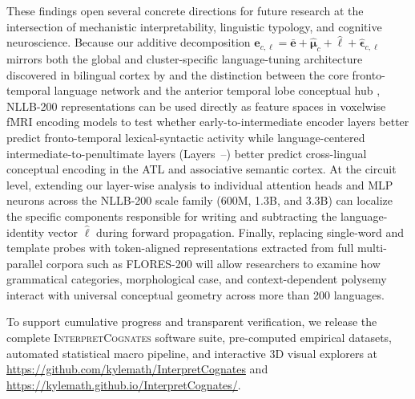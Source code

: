 These findings open several concrete directions for future research at the intersection of mechanistic interpretability, linguistic typology, and cognitive neuroscience.
Because our additive decomposition $\mathbf{e}_{c,\ell} = \bar{\mathbf{e}} + \hat{\boldsymbol{\mu}}_c + \hat{\boldsymbol{\ell}} + \hat{\boldsymbol{\epsilon}}_{c,\ell}$ mirrors both the global and cluster-specific language-tuning architecture discovered in bilingual cortex by \citet{deniz2025} and the distinction between the core fronto-temporal language network \citep{malikmoraleda2022} and the anterior temporal lobe conceptual hub \citep{correia2014}, NLLB-200 representations can be used directly as feature spaces in voxelwise fMRI encoding models to test whether early-to-intermediate encoder layers better predict fronto-temporal lexical-syntactic activity while language-centered intermediate-to-penultimate layers (Layers~\LayerwisePhaseTrans{}--\LayerwisePeakLayer{}) better predict cross-lingual conceptual encoding in the ATL and associative semantic cortex.
At the circuit level, extending our layer-wise analysis to individual attention heads and MLP neurons \citep{voita2019,clark2019} across the NLLB-200 scale family (600M, 1.3B, and 3.3B) can localize the specific components responsible for writing and subtracting the language-identity vector $\hat{\boldsymbol{\ell}}$ during forward propagation.
Finally, replacing single-word and template probes with token-aligned representations extracted from full multi-parallel corpora such as FLORES-200 \citep{nllbteam2022} will allow researchers to examine how grammatical categories, morphological case, and context-dependent polysemy interact with universal conceptual geometry across more than 200 languages.

To support cumulative progress and transparent verification, we release the complete \textsc{InterpretCognates} software suite, pre-computed empirical datasets, automated statistical macro pipeline, and interactive 3D visual explorers at \url{https://github.com/kylemath/InterpretCognates} and \url{https://kylemath.github.io/InterpretCognates/}.
